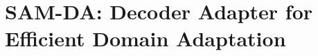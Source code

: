 \graphicspath{{appendices/}{sam_da/}{Figures/}}

\chapter[SAM-DA: Decoder Adapter]{SAM-DA: Decoder Adapter for Efficient Domain Adaptation}




